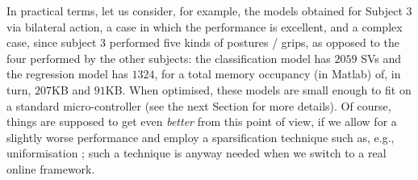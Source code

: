 In practical terms, let us consider, for example, the models obtained
for Subject $3$ via bilateral action, a case in which the performance
is excellent, and a complex case, since subject $3$ performed five
kinds of postures / grips, as opposed to the four performed by the
other subjects: the classification model has $2059$ SVs and the
regression model has $1324$, for a total memory occupancy (in Matlab)
of, in turn, $207$KB and $91$KB. When optimised, these models are small
enough to fit on a standard micro-controller (see the next Section for
more details). Of course, things are supposed to get even
\emph{better} from this point of view, if we allow for a slightly
worse performance and employ a sparsification technique such as, e.g.,
uniformisation \cite{2008.ICRA,2008.BioCyb}; such a technique is
anyway needed when we switch to a real online framework.
